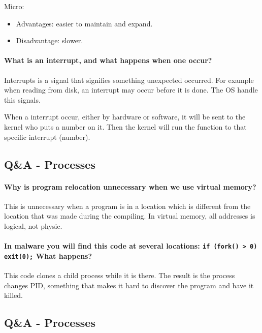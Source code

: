 \documentclass[11pt,a4paper]{article}
\begin{document}
Micro:
\begin{itemize}
\item{Advantages: easier to maintain and expand.}
\item{Disadvantage: slower.}
\end{itemize}

\paragraph{What is an interrupt, and what happens when one occur?}
Interrupts is a signal that signifies something unexpected occurred. For example when reading from disk, an interrupt may occur before it is done. The OS handle this signals.

When a interrupt occur, either by hardware or software, it will be sent to the kernel who puts a number on it. Then the kernel will run the function to that specific interrupt (number).

\subsection{Q\&A - Processes}
\paragraph{Why is program relocation unnecessary when we use virtual memory?}
This is unnecessary when a program is in a location which is different from the location that was made during the compiling. In virtual memory, all addresses is logical, not physic. 

\paragraph{In malware you will find this code at several locations: \texttt{if (fork() > 0) exit(0);} What happens?}
This code clones a child process while it is there. The result is the process changes PID, something that makes it hard to discover the program and have it killed.

\subsection{Q\&A - Processes}
\end{document}
